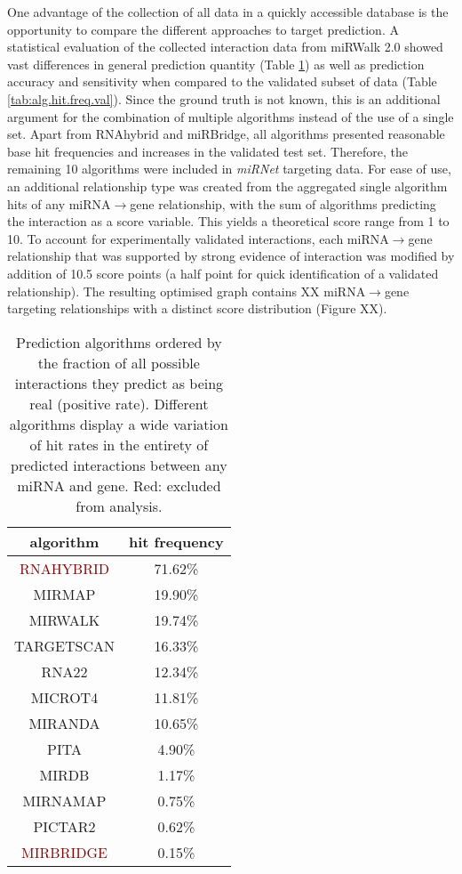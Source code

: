 One advantage of the collection of all data in a quickly accessible database is the opportunity to compare the different approaches to target prediction. A statistical evaluation of the collected interaction data from miRWalk 2.0 showed vast differences in general prediction quantity (Table \ref{tab:alg.hit.freq.all}) as well as prediction accuracy and sensitivity when compared to the validated subset of data (Table \ref{tab:alg.hit.freq.val}). Since the ground truth is not known, this is an additional argument for the combination of multiple algorithms instead of the use of a single set. Apart from RNAhybrid and miRBridge, all algorithms presented reasonable base hit frequencies and increases in the validated test set. Therefore, the remaining 10 algorithms were included in \textit{miRNet} targeting data. For ease of use, an additional relationship type was created from the aggregated single algorithm hits of any miRNA$\to$gene relationship, with the sum of algorithms predicting the interaction as a score variable. This yields a theoretical score range from 1 to 10. To account for experimentally validated interactions, each miRNA$\to$gene relationship that was supported by strong evidence of interaction was modified by addition of 10.5 score points (a half point for quick identification of a validated relationship). The resulting optimised graph contains XX miRNA$\to$gene targeting relationships with a distinct score distribution (Figure XX).


\begin{table}
\centering
\begin{tabular}{c | c}
algorithm & hit frequency\\ \hline
\hline
\textcolor{Maroon}{RNAHYBRID} & 71.62\%\\ \hline
\textcolor{OliveGreen}{MIRMAP} & 19.90\%\\ \hline
\textcolor{OliveGreen}{MIRWALK} & 19.74\%\\ \hline
\textcolor{OliveGreen}{TARGETSCAN} & 16.33\%\\ \hline
\textcolor{OliveGreen}{RNA22} & 12.34\%\\ \hline
\textcolor{OliveGreen}{MICROT4} & 11.81\%\\ \hline
\textcolor{OliveGreen}{MIRANDA} & 10.65\%\\ \hline
\textcolor{OliveGreen}{PITA} & 4.90\%\\ \hline
\textcolor{OliveGreen}{MIRDB} & 1.17\%\\ \hline
\textcolor{OliveGreen}{MIRNAMAP} & 0.75\%\\ \hline
\textcolor{OliveGreen}{PICTAR2} & 0.62\%\\ \hline
\textcolor{Maroon}{MIRBRIDGE} & 0.15\%\\ \hline
\end{tabular}
\caption{Prediction algorithms ordered by the fraction of all possible interactions they predict as being real (positive rate). Different algorithms display a wide variation of hit rates in the entirety of predicted interactions between any miRNA and gene. Red: excluded from analysis.}
\label{tab:alg.hit.freq.all}
\end{table}

